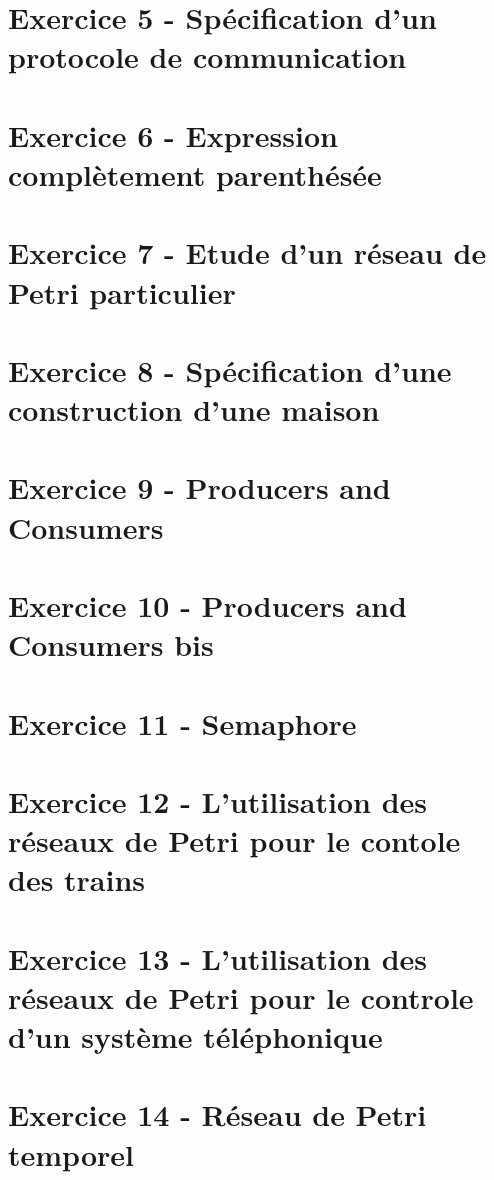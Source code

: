 \documentclass[]{article}
\begin{document}
\section{Exercice 5 - Spécification d'un protocole de communication}

\section{Exercice 6 - Expression complètement parenthésée}

\section{Exercice 7 - Etude d'un réseau de Petri particulier}

\section{Exercice 8 - Spécification d'une construction d'une maison}

\section{Exercice 9 - Producers and Consumers}

\section{Exercice 10 - Producers and Consumers bis}

\section{Exercice 11 - Semaphore}

\section{Exercice 12 - L'utilisation des réseaux de Petri pour le contole des trains}

\section{Exercice 13 - L'utilisation des réseaux de Petri pour le controle d'un système téléphonique}

\section{Exercice 14 - Réseau de Petri temporel}

\end{document}
